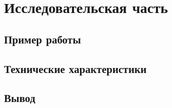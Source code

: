 \chapter{Исследовательская часть}

\section{Пример работы}

\section{Технические характеристики}

\section*{Вывод}
